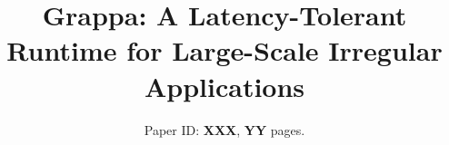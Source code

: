 
\usepackage{microtype}




\title{\Large Grappa: A Latency-Tolerant Runtime for Large-Scale Irregular Applications}


\author{Paper ID: {\bf XXX}, {\bf YY} pages.}
\date{}


\maketitle
\begin{abstract}

\end{abstract}



















%







